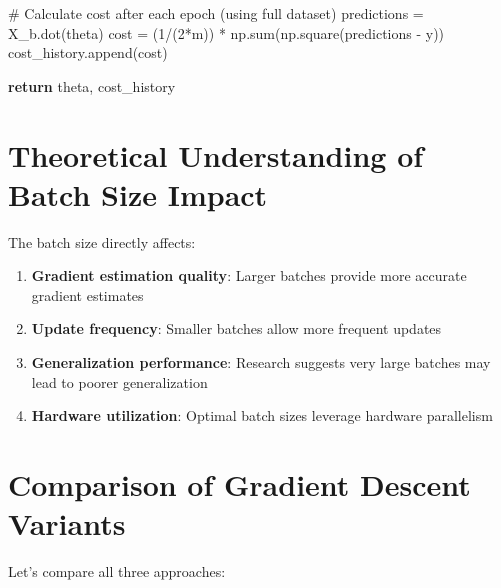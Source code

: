 \documentclass[
  letterpaper,
  DIV=11,
  numbers=noendperiod]{scrreprt}
\newenvironment{Shaded}{\begin{snugshade}}{\end{snugshade}}
\newcommand{\BuiltInTok}[1]{\textcolor[rgb]{0.00,0.23,0.31}{#1}}
\newcommand{\CommentTok}[1]{\textcolor[rgb]{0.37,0.37,0.37}{#1}}
\newcommand{\ControlFlowTok}[1]{\textcolor[rgb]{0.00,0.23,0.31}{\textbf{#1}}}
\newcommand{\DecValTok}[1]{\textcolor[rgb]{0.68,0.00,0.00}{#1}}
\newcommand{\NormalTok}[1]{\textcolor[rgb]{0.00,0.23,0.31}{#1}}
\newcommand{\OperatorTok}[1]{\textcolor[rgb]{0.37,0.37,0.37}{#1}}
\providecommand{\tightlist}{%
  \setlength{\itemsep}{0pt}\setlength{\parskip}{0pt}}\usepackage{longtable,booktabs,array}
\begin{document}
\begin{Shaded}
\begin{Highlighting}[]
        \CommentTok{\# Calculate cost after each epoch (using full dataset)}
\NormalTok{        predictions }\OperatorTok{=}\NormalTok{ X\_b.dot(theta)}
\NormalTok{        cost }\OperatorTok{=}\NormalTok{ (}\DecValTok{1}\OperatorTok{/}\NormalTok{(}\DecValTok{2}\OperatorTok{*}\NormalTok{m)) }\OperatorTok{*}\NormalTok{ np.}\BuiltInTok{sum}\NormalTok{(np.square(predictions }\OperatorTok{{-}}\NormalTok{ y))}
\NormalTok{        cost\_history.append(cost)}
        
    \ControlFlowTok{return}\NormalTok{ theta, cost\_history}
\end{Highlighting}
\end{Shaded}

\section{Theoretical Understanding of Batch Size
Impact}\label{theoretical-understanding-of-batch-size-impact}

The batch size directly affects:

\begin{enumerate}
\def\labelenumi{\arabic{enumi}.}
\tightlist
\item
  \textbf{Gradient estimation quality}: Larger batches provide more
  accurate gradient estimates
\item
  \textbf{Update frequency}: Smaller batches allow more frequent updates
\item
  \textbf{Generalization performance}: Research suggests very large
  batches may lead to poorer generalization
\item
  \textbf{Hardware utilization}: Optimal batch sizes leverage hardware
  parallelism
\end{enumerate}

\section{Comparison of Gradient Descent
Variants}\label{comparison-of-gradient-descent-variants}

Let's compare all three approaches:
\end{document}
